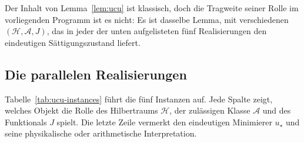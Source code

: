 \documentclass[11pt]{article}
\theoremstyle{definition}
\theoremstyle{remark}
\begin{document}
Der Inhalt von Lemma~\ref{lem:ucu} ist klassisch, doch die Tragweite seiner
Rolle im vorliegenden Programm ist es nicht: Es ist dasselbe Lemma,
mit verschiedenen $(\mathcal{H}, \mathcal{A}, J)$, das in jeder der
unten aufgelisteten fünf Realisierungen den eindeutigen Sättigungszustand liefert.

\subsection{Die parallelen Realisierungen}
\label{sec:ucu-instances}

Tabelle~\ref{tab:ucu-instances} führt die fünf Instanzen auf.
Jede Spalte zeigt, welches Objekt die Rolle des Hilbertraums $\mathcal{H}$,
der zulässigen Klasse $\mathcal{A}$ und des Funktionals $J$ spielt. Die letzte Zeile
vermerkt den eindeutigen Minimierer $u_\star$ und seine physikalische oder arithmetische
Interpretation.
\end{document}
